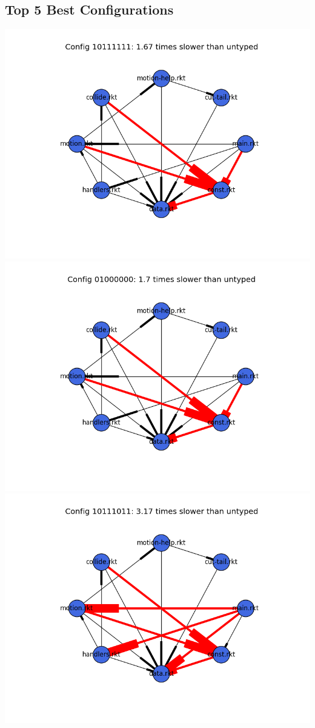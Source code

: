 \documentclass{article}
\begin{document}
\begin{itemize}
\subsection{Top 5 Best Configurations}
\includegraphics[width=\textwidth]{snake-2015-04-10-module-graph-10111111.png}
\includegraphics[width=\textwidth]{snake-2015-04-10-module-graph-01000000.png}
\includegraphics[width=\textwidth]{snake-2015-04-10-module-graph-10111011.png}

\end{itemize}
\end{document}
